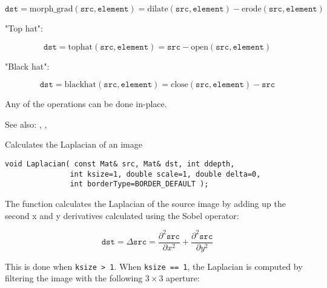 \[
\texttt{dst}=\mathrm{morph\_grad}(\texttt{src},\texttt{element})=\mathrm{dilate}(\texttt{src},\texttt{element})-\mathrm{erode}(\texttt{src},\texttt{element})
\]

"Top hat":

\[
\texttt{dst}=\mathrm{tophat}(\texttt{src},\texttt{element})=\texttt{src}-\mathrm{open}(\texttt{src},\texttt{element})
\]

"Black hat":

\[
\texttt{dst}=\mathrm{blackhat}(\texttt{src},\texttt{element})=\mathrm{close}(\texttt{src},\texttt{element})-\texttt{src}
\]

Any of the operations can be done in-place.

See also: , , 

Calculates the Laplacian of an image

\begin{lstlisting}
void Laplacian( const Mat& src, Mat& dst, int ddepth,
               int ksize=1, double scale=1, double delta=0,
               int borderType=BORDER_DEFAULT );
\end{lstlisting}
\begin{description}
\end{description}

The function calculates the Laplacian of the source image by adding up the second x and y derivatives calculated using the Sobel operator:

\[
\texttt{dst} = \Delta \texttt{src} = \frac{\partial^2 \texttt{src}}{\partial x^2} + \frac{\partial^2 \texttt{src}}{\partial y^2}
\]


This is done when \texttt{ksize > 1}. When \texttt{ksize == 1}, the Laplacian is computed by filtering the image with the following $3 \times 3$ aperture:

